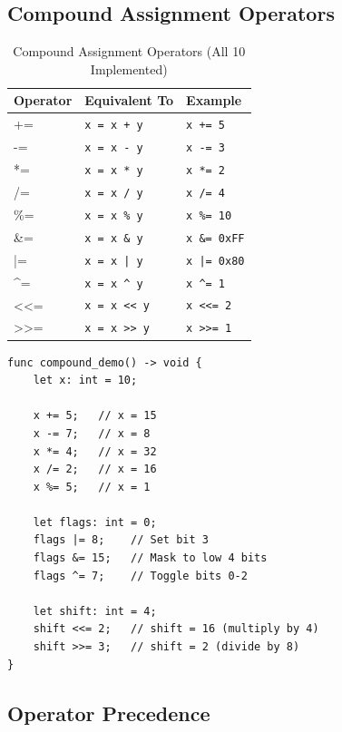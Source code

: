 \documentclass[12pt,a4paper,oneside]{book}
\newcommand{\code}[1]{\texttt{#1}}
\begin{document}
\subsection{Compound Assignment Operators}

\begin{table}[H]
\centering
\caption{Compound Assignment Operators (All 10 Implemented)}
\begin{tabularx}{\textwidth}{|l|X|l|}
\hline
\textbf{Operator} & \textbf{Equivalent To} & \textbf{Example} \\
\hline
+= & \code{x = x + y} & \code{x += 5} \\
-= & \code{x = x - y} & \code{x -= 3} \\
*= & \code{x = x * y} & \code{x *= 2} \\
/= & \code{x = x / y} & \code{x /= 4} \\
\%= & \code{x = x \% y} & \code{x \%= 10} \\
\&= & \code{x = x \& y} & \code{x \&= 0xFF} \\
|= & \code{x = x | y} & \code{x |= 0x80} \\
\^{}= & \code{x = x \^{} y} & \code{x \^{}= 1} \\
<<= & \code{x = x << y} & \code{x <<= 2} \\
>>= & \code{x = x >> y} & \code{x >>= 1} \\
\hline
\end{tabularx}
\end{table}

\begin{lstlisting}[style=algo, caption={Compound Assignment Examples}]
func compound_demo() -> void {
    let x: int = 10;
    
    x += 5;   // x = 15
    x -= 7;   // x = 8
    x *= 4;   // x = 32
    x /= 2;   // x = 16
    x %= 5;   // x = 1
    
    let flags: int = 0;
    flags |= 8;    // Set bit 3
    flags &= 15;   // Mask to low 4 bits
    flags ^= 7;    // Toggle bits 0-2
    
    let shift: int = 4;
    shift <<= 2;   // shift = 16 (multiply by 4)
    shift >>= 3;   // shift = 2 (divide by 8)
}
\end{lstlisting}

\subsection{Operator Precedence}
\end{document}
